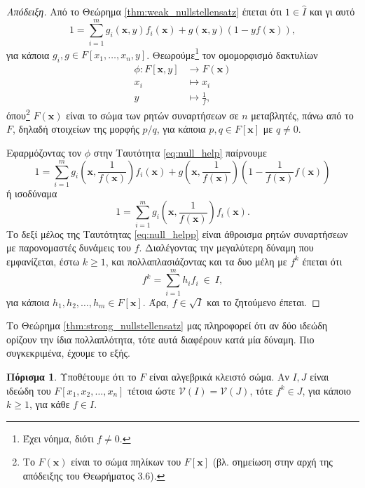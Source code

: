\documentclass[12pt,a4paper,reqno]{amsart}
\theoremstyle{definition}
\newtheorem{corollary}[theorem]{Πόρισμα}
\theoremstyle{remark}
\numberwithin{theorem}{section}
\numberwithin{exercise}{section}
\numberwithin{equation}{section}
\newcommand{\vV}{\mathcal{V}}
\newcommand{\bfx}{\pmb{x}}
\renewcommand{\to}{\rightarrow}
\newcommand{\mapstoto}{\longmapsto}
\newcommand{\Pol}[1]{F[x_1, x_2, \dots, x_{#1}]}
\begin{document}
\begin{proof}[Απόδειξη]
  Από το Θεώρημα \ref{thm:weak_nullstellensatz} έπεται ότι $1 \in \hat{I}$ και γι αυτό 
  \begin{equation}
    \label{eq:null_help}
    1 = \sum_{i=1}^m g_i(\bfx,y)f_i(\bfx) + g(\bfx,y)(1-yf(\bfx)),
  \end{equation}
  για κάποια $g_i, g \in F[x_1, \dots, x_n, y]$. Θεωρούμε\footnote{Έχει νόημα, διότι $f \neq 0$.} τον ομομορφισμό δακτυλίων 
  \begin{align*}
    \phi : F[\bfx,y] &\to F(\bfx) \\
    x_i &\mapsto x_i \\
    y &\mapstoto \frac{1}{f},
  \end{align*}
  όπου\footnote{Το $F(\bfx)$ είναι το σώμα πηλίκων του $F[\bfx]$ (βλ. σημείωση στην αρχή της απόδειξης του Θεωρήματος 3.6).} $F(\bfx)$ είναι το σώμα των ρητών συναρτήσεων σε $n$ μεταβλητές, πάνω από το $F$, δηλαδή στοιχείων της μορφής $p/q$, για κάποια $p, q \in F[\bfx]$ με $q \neq 0$.

  Εφαρμόζοντας τον $\phi$ στην Ταυτότητα \eqref{eq:null_help} παίρνουμε 
  \[
  1 = \sum_{i=1}^m g_i\left(\bfx, \frac{1}{f(\bfx)}\right)f_i(\bfx) + g\left(\bfx,\frac{1}{f(\bfx)}\right)\left(
    1 - \frac{1}{f(\bfx)}f(\bfx)
  \right)
  \]
  ή ισοδύναμα 
  \begin{equation}
    \label{eq:null_helpp}
    1 = \sum_{i=1}^m g_i\left(\bfx, \frac{1}{f(\bfx)}\right)f_i(\bfx).
  \end{equation}
  Το δεξί μέλος της Ταυτότητας \eqref{eq:null_helpp} είναι άθροισμα ρητών συναρτήσεων με παρονομαστές δυνάμεις του $f$. Διαλέγοντας την μεγαλύτερη δύναμη που εμφανίζεται, έστω $k \ge 1$, και πολλαπλασιάζοντας και τα δυο μέλη με $f^k$ έπεται ότι 
  \[
  f^k = \sum_{i=1}^m h_i f_i \ \in \ I,
  \]
  για κάποια $h_1, h_2, \dots, h_m \in F[\bfx]$. Άρα, $f \in \sqrt{I}$ και το ζητούμενο έπεται.
\end{proof}

Το Θεώρημα \ref{thm:strong_nullstellensatz} μας πληροφορεί ότι αν δύο ιδεώδη ορίζουν την ίδια πολλαπλότητα, τότε αυτά διαφέρουν κατά μία δύναμη. Πιο συγκεκριμένα, έχουμε το εξής.
\begin{corollary}
  \label{cor:strong_nullstellensatz}
  Υποθέτουμε ότι το $F$ είναι αλγεβρικά κλειστό σώμα. Αν $I, J$ είναι ιδεώδη του $\Pol{n}$ τέτοια ώστε $\vV(I) = \vV(J)$, τότε $f^k \in J$, για κάποιο $k \ge 1$, για κάθε $f \in I$.
\end{corollary}

\end{document}

